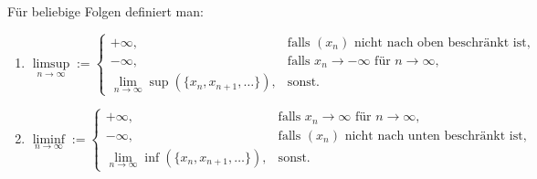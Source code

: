 Für beliebige Folgen definiert man:
\begin{enumerate}[label=\alph*)]
    \item $$\limsup_{n \to \infty} :=
    \begin{cases}
        + \infty, & \text{falls $(x_n)$ nicht nach oben beschränkt ist,} \\
        - \infty, & \text{falls $x_n \to -\infty$ für $n \to \infty$,} \\
        \lim_{n \to \infty}\sup(\{x_n, x_{n+1}, \dots\}), & \text{sonst.}
    \end{cases}$$
    \item $$\liminf_{n \to \infty} :=
    \begin{cases}
        + \infty, & \text{falls $x_n \to \infty$ für $n \to \infty$,} \\
        - \infty, & \text{falls $(x_n)$ nicht nach unten beschränkt ist,} \\
        \lim_{n \to \infty}\inf(\{x_n, x_{n+1}, \dots\}), & \text{sonst.}
    \end{cases}
    $$
\end{enumerate}